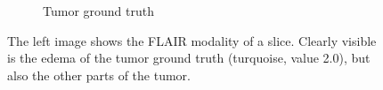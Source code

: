 \begin{figure}[H]
\begin{subfigure}{.5\textwidth}
        \caption{Tumor ground truth}
    \end{subfigure}
    \caption{The left image shows the FLAIR modality of a slice. Clearly visible is the edema of the tumor ground truth (turquoise, value 2.0), but also the other parts of the tumor.}
    \label{hdm_smaller_circles}
\end{figure}